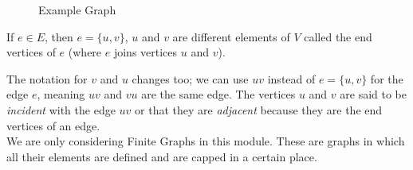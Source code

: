 
\begin{minipage}{0.4\textwidth}
    \begin{figure}[H]
        \centering
        \caption{Example Graph}
    \end{figure}
\end{minipage} \hfill
\begin{minipage}{0.55\textwidth}
If $e \in E$, then $e = \{u, v\}$, $u$ and $v$ are different elements of $V$ called the end vertices of $e$ (where $e$ joins vertices $u$ and $v$). 
\end{minipage}\vspace{0.5em}

The notation for $v$ and $u$ changes too; we can use $uv$ instead of $e = \{u, v\}$ for the edge $e$, meaning $uv$ and $vu$ are the same edge. The vertices $u$ and $v$ are said to be \textit{incident} with the edge $uv$ or that they are \textit{adjacent} because they are the end vertices of an edge.\\

We are only considering Finite Graphs in this module. These are graphs in which all their elements are defined and are capped in a certain place.

